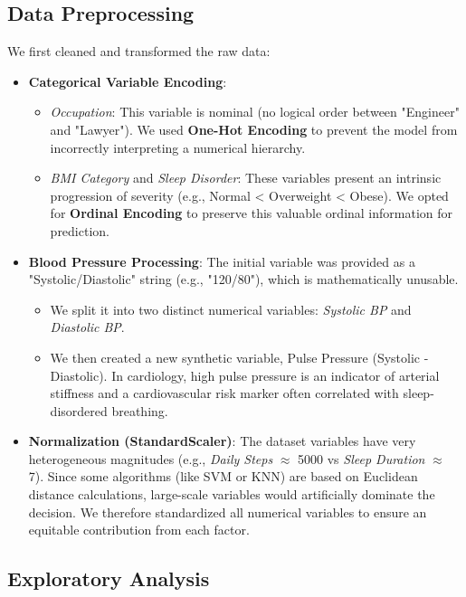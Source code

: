 \documentclass[12pt,a4paper]{article}
\begin{document}
    \subsection{Data Preprocessing}
    We first cleaned and transformed the raw data:
    \begin{itemize}
        \item \textbf{Categorical Variable Encoding}:
        \begin{itemize}
            \item \textit{Occupation}: This variable is nominal (no logical order between "Engineer" and "Lawyer"). We used \textbf{One-Hot Encoding} to prevent the model from incorrectly interpreting a numerical hierarchy.
            \item \textit{BMI Category} and \textit{Sleep Disorder}: These variables present an intrinsic progression of severity (e.g., Normal < Overweight < Obese). We opted for \textbf{Ordinal Encoding} to preserve this valuable ordinal information for prediction.
        \end{itemize}

        \item \textbf{Blood Pressure Processing}:
        The initial variable was provided as a "Systolic/Diastolic" string (e.g., "120/80"), which is mathematically unusable.
        \begin{itemize}
            \item We split it into two distinct numerical variables: \textit{Systolic BP} and \textit{Diastolic BP}.
            \item We then created a new synthetic variable, Pulse Pressure (Systolic - Diastolic). In cardiology, high pulse pressure is an indicator of arterial stiffness and a cardiovascular risk marker often correlated with sleep-disordered breathing.
        \end{itemize}

        \item \textbf{Normalization (StandardScaler)}:
        The dataset variables have very heterogeneous magnitudes (e.g., \textit{Daily Steps} $\approx$ 5000 vs \textit{Sleep Duration} $\approx$ 7).
        Since some algorithms (like SVM or KNN) are based on Euclidean distance calculations, large-scale variables would artificially dominate the decision. We therefore standardized all numerical variables to ensure an equitable contribution from each factor.
    \end{itemize}

    \subsection{Exploratory Analysis}
\end{document}
